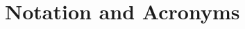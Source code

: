 \documentclass[10pt,a4paper,twoside]{book}
\begin{document}

\chapter*{Notation and Acronyms}



\end{document}
